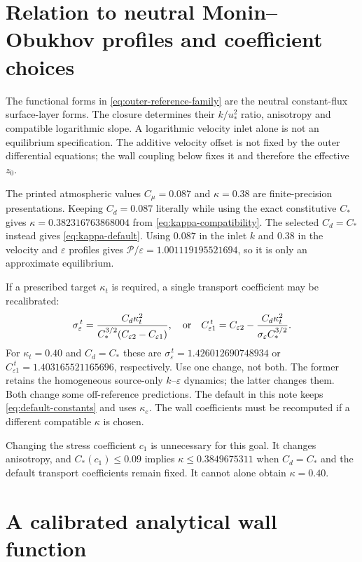 \documentclass[11pt,a4paper]{article}
\numberwithin{equation}{section}
\newcommand{\eps}{\varepsilon}
\begin{document}
\section{Relation to neutral Monin--Obukhov profiles and coefficient choices}
\label{sec:most}
The functional forms in \eqref{eq:outer-reference-family} are the neutral
constant-flux surface-layer forms. The closure determines their
$k/u_*^2$ ratio, anisotropy and compatible logarithmic slope. A logarithmic
velocity inlet alone is not an equilibrium specification.
The additive velocity offset is not fixed by the outer differential
equations; the wall coupling below fixes it and therefore the effective
$z_0$.

The printed atmospheric values $C_\mu=0.087$ and $\kappa=0.38$
are finite-precision presentations. Keeping $C_d=0.087$ literally while
using the exact constitutive $C_*$ gives
$\kappa=0.382316763868004$ from \eqref{eq:kappa-compatibility}.
The selected $C_d=C_*$ instead gives \eqref{eq:kappa-default}.
Using $0.087$ in the inlet $k$ and $0.38$ in the velocity and $\eps$
profiles gives $\mathcal P/\eps=1.001119195521694$, so it is only
an approximate equilibrium.

If a prescribed target $\kappa_t$ is required, a single transport
coefficient may be recalibrated:
\begin{equation}
 \sigma_\eps^{\,t}
 =\frac{C_d\kappa_t^2}
 {C_*^{3/2}(C_{\eps2}-C_{\eps1})},
 \quad\hbox{or}\quad
 C_{\eps1}^{\,t}
 =C_{\eps2}-\frac{C_d\kappa_t^2}{\sigma_\eps C_*^{3/2}}.
 \label{eq:target-kappa}
\end{equation}
For $\kappa_t=0.40$ and $C_d=C_*$ these are
$\sigma_\eps^{\,t}=1.426012690748934$ or
$C_{\eps1}^{\,t}=1.403165521165696$, respectively.
Use one change, not both. The former retains the homogeneous
source-only $k$--$\eps$ dynamics; the latter changes them.
Both change some off-reference predictions. The default in this note
keeps \eqref{eq:default-constants} and uses $\kappa_e$.
The wall coefficients must be recomputed if a different compatible
$\kappa$ is chosen.

Changing the stress coefficient $c_1$ is unnecessary for this goal.
It changes anisotropy, and $C_*(c_1)\leq0.09$ implies
$\kappa\leq0.3849675311$ when $C_d=C_*$ and the default transport
coefficients remain fixed. It cannot alone obtain $\kappa=0.40$.


\section{A calibrated analytical wall function}
\label{sec:wj-wall-kernel}
\end{document}
